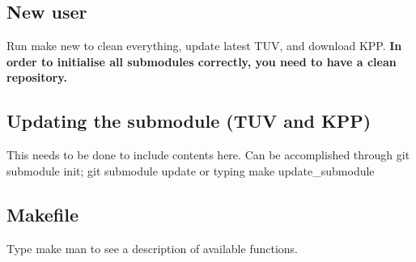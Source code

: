 \subsection*{New user}

Run {\ttfamily make new} to clean everything, update latest T\+UV, and download K\+PP. {\bfseries In order to initialise all submodules correctly, you need to have a clean repository.}

\subsection*{Updating the submodule (T\+UV and K\+PP)}

This needs to be done to include contents here. Can be accomplished through {\ttfamily git submodule init; git submodule update} or typing {\ttfamily make update\+\_\+submodule}

\subsection*{Makefile}

Type {\ttfamily make man} to see a description of available functions. 